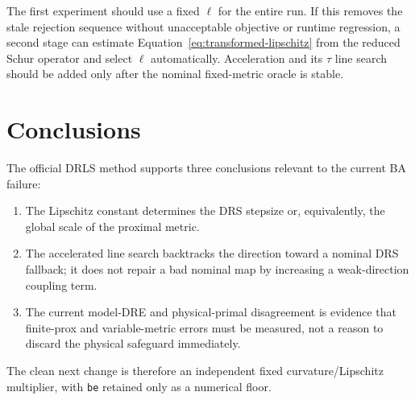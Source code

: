 \documentclass[11pt]{article}
\begin{document}
The first experiment should use a fixed $\ell$ for the entire run. If this
removes the stale rejection sequence without unacceptable objective or runtime
regression, a second stage can estimate
Equation~\eqref{eq:transformed-lipschitz} from the reduced Schur operator and
select $\ell$ automatically. Acceleration and its $\tau$ line search should be
added only after the nominal fixed-metric oracle is stable.

\section{Conclusions}

The official DRLS method supports three conclusions relevant to the current BA
failure:
\begin{enumerate}
  \item The Lipschitz constant determines the DRS stepsize or, equivalently,
        the global scale of the proximal metric.
  \item The accelerated line search backtracks the direction toward a nominal
        DRS fallback; it does not repair a bad nominal map by increasing a
        weak-direction coupling term.
  \item The current model-DRE and physical-primal disagreement is evidence that
        finite-prox and variable-metric errors must be measured, not a reason
        to discard the physical safeguard immediately.
\end{enumerate}

The clean next change is therefore an independent fixed curvature/Lipschitz
multiplier, with \texttt{be} retained only as a numerical floor.
\end{document}
